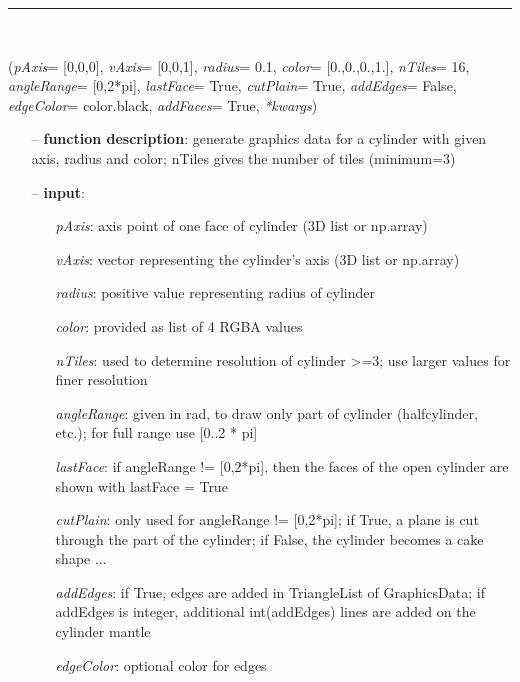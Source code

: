 \begin{itemize}[leftmargin=1.4cm]
\begin{itemize}[leftmargin=1.4cm]
\begin{itemize}[leftmargin=1.4cm]
\begin{itemize}[leftmargin=0.5cm]
\begin{itemize}[leftmargin=1.4cm]
\begin{itemize}[leftmargin=1.4cm]
\begin{itemize}[leftmargin=0.5cm]
\begin{itemize}[leftmargin=1.4cm]
%
\noindent\rule{8cm}{0.75pt}\vspace{1pt} \\ 
\begin{flushleft}
\label{sec:graphics:Cylinder}
({\it pAxis}= [0,0,0], {\it vAxis}= [0,0,1], {\it radius}= 0.1, {\it color}= [0.,0.,0.,1.], {\it nTiles}= 16, {\it angleRange}= [0,2*pi], {\it lastFace}= True, {\it cutPlain}= True, {\it addEdges}= False, {\it edgeColor}= color.black, {\it addFaces}= True, {\it **kwargs})
\end{flushleft}
\setlength{\itemindent}{0.7cm}
\begin{itemize}[leftmargin=0.7cm]
\item[--]
{\bf function description}: generate graphics data for a cylinder with given axis, radius and color; nTiles gives the number of tiles (minimum=3)
\item[--]
{\bf input}: \vspace{-6pt}
\begin{itemize}[leftmargin=1.2cm]
\setlength{\itemindent}{-0.7cm}
\item[]{\it pAxis}: axis point of one face of cylinder (3D list or np.array)
\item[]{\it vAxis}: vector representing the cylinder's axis (3D list or np.array)
\item[]{\it radius}: positive value representing radius of cylinder
\item[]{\it color}: provided as list of 4 RGBA values
\item[]{\it nTiles}: used to determine resolution of cylinder >=3; use larger values for finer resolution
\item[]{\it angleRange}: given in rad, to draw only part of cylinder (halfcylinder, etc.); for full range use [0..2 * pi]
\item[]{\it lastFace}: if angleRange != [0,2*pi], then the faces of the open cylinder are shown with lastFace = True
\item[]{\it cutPlain}: only used for angleRange != [0,2*pi]; if True, a plane is cut through the part of the cylinder; if False, the cylinder becomes a cake shape ...
\item[]{\it addEdges}: if True, edges are added in TriangleList of GraphicsData; if addEdges is integer, additional int(addEdges) lines are added on the cylinder mantle
\item[]{\it edgeColor}: optional color for edges

\end{itemize}
\end{itemize}
\end{itemize}
\end{itemize}
\end{itemize}
\end{itemize}
\end{itemize}
\end{itemize}
\end{itemize}
\end{itemize}
